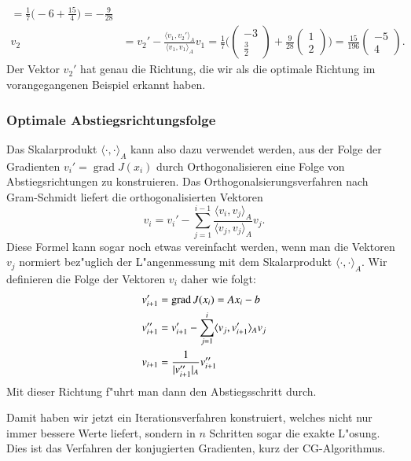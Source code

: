 \begin{beispiel}
\begin{align*}
=\frac17\biggl(-6+\frac{15}{4}\biggr)
=-\frac9{28}
\\
v_2&=
v_2'-\frac{\langle v_1,v_2'\rangle_A}{\langle v_1,v_1\rangle_A}v_1
=
\frac17\biggl(
\begin{pmatrix}-3\\\frac32\end{pmatrix}
+\frac9{28}
\begin{pmatrix}1\\2\end{pmatrix}
\biggr)
=
\frac{15}{196}\begin{pmatrix}-5\\4\end{pmatrix}.
\end{align*}
Der Vektor $v_2'$ hat genau die Richtung, die wir als die optimale
Richtung im vorangegangenen Beispiel erkannt haben.
\end{beispiel}

\subsubsection{Optimale Abstiegsrichtungsfolge}
Das Skalarprodukt $\langle\cdot,\cdot\rangle_A$ kann also dazu verwendet
werden, aus der Folge der Gradienten $v_i'=\operatorname{grad}J(x_i)$
durch Orthogonalisieren eine Folge von Abstiegsrichtungen zu 
konstruieren.
Das Orthogonalsierungsverfahren nach Gram-Schmidt liefert die
orthogonalisierten Vektoren
\[
v_i=v_i' - \sum_{j=1}^{i-1}\frac{\langle v_i,v_j\rangle_A}{\langle v_j,v_j\rangle_A}v_j.
\]
Diese Formel kann sogar noch etwas vereinfacht werden, wenn man die
Vektoren $v_j$ normiert bez"uglich der L"angenmessung mit dem Skalarprodukt
$\langle\cdot,\cdot\rangle_A$.
Wir definieren die Folge der Vektoren $v_i$ daher wie folgt:
\begin{align}
v_{i+1}'&=\operatorname{grad}J(x_i)=Ax_i-b
\notag\\
v_{i+1}''&=v_{i+1}'-\sum_{j=1}^{i}\langle v_j,v_{i+1}'\rangle_A v_j
\label{cg:ortho}
\\
v_{i+1}&=\frac1{|v_{i+1}''|_A}v_{i+1}''
\notag
\end{align}
Mit dieser Richtung f"uhrt man dann den Abstiegsschritt durch.

Damit haben wir jetzt ein Iterationsverfahren konstruiert, welches nicht
nur immer bessere Werte liefert, sondern in $n$ Schritten sogar die exakte
L"osung.
Dies ist das Verfahren der konjugierten Gradienten, kurz der CG-Algorithmus.


